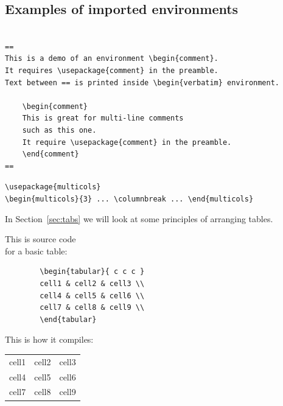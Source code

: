 \documentclass[a4paper,11pt]{article}
\begin{document}
\subsection{Examples of imported environments}


\begin{verbatim}

==
This is a demo of an environment \begin{comment}. 
It requires \usepackage{comment} in the preamble. 
Text between == is printed inside \begin{verbatim} environment.

	\begin{comment}
	This is great for multi-line comments 
	such as this one.
	It require \usepackage{comment} in the preamble.
	\end{comment}
==
\end{verbatim}

\verb|\usepackage{multicols}| \\
\verb|\begin{multicols}{3} ... \columnbreak ... \end{multicols}|

\begin{multicols}{3} %
	\clearpage\maketitle
	\thispagestyle{empty}
	
	In Section~\ref{sec:tabs} we will look at some principles of arranging tables.

	\columnbreak 
	This is source code \\ for a basic table:
	\begin{verbatim}
		\begin{tabular}{ c c c } 
		cell1 & cell2 & cell3 \\ 
		cell4 & cell5 & cell6 \\ 
		cell7 & cell8 & cell9 \\ 
		\end{tabular}
	\end{verbatim}

	\columnbreak
	This is how it compiles:
	\begin{tabular}{ c c c } 
		cell1 & cell2 & cell3 \\
		cell4 & cell5 & cell6 \\ 
		cell7 & cell8 & cell9 \\ 
	\end{tabular}
	\setlength\fboxsep{3pt} %
	\setlength\fboxrule{1pt} %
\end{multicols}
\end{document}
